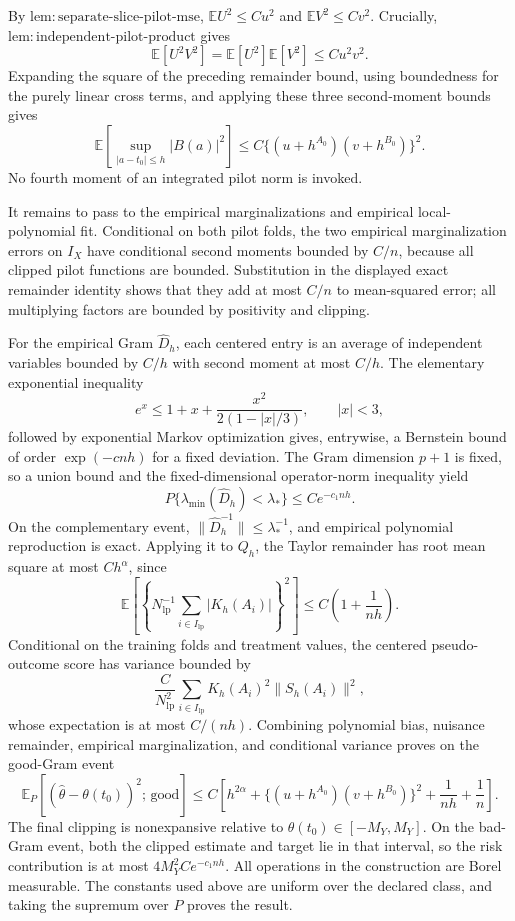 By \(\mathrm{lem:separate\text{-}slice\text{-}pilot\text{-}mse}\), \(\mathbb E U^2\le Cu^2\) and \(\mathbb E V^2\le Cv^2\). Crucially, \(\mathrm{lem:independent\text{-}pilot\text{-}product}\) gives
\[
\mathbb E[U^2V^2]=\mathbb E[U^2]\mathbb E[V^2]\le Cu^2v^2.
\]
Expanding the square of the preceding remainder bound, using boundedness for the purely linear cross terms, and applying these three second-moment bounds gives
\[
\mathbb E\left[\sup_{|a-t_0|\le h}|B(a)|^2\right]
\le C\{(u+h^{A_0})(v+h^{B_0})\}^2.
\]
No fourth moment of an integrated pilot norm is invoked.

It remains to pass to the empirical marginalizations and empirical local-polynomial fit. Conditional on both pilot folds, the two empirical marginalization errors on \(I_X\) have conditional second moments bounded by \(C/n\), because all clipped pilot functions are bounded. Substitution in the displayed exact remainder identity shows that they add at most \(C/n\) to mean-squared error; all multiplying factors are bounded by positivity and clipping.

For the empirical Gram \(\widehat D_h\), each centered entry is an average of independent variables bounded by \(C/h\) with second moment at most \(C/h\). The elementary exponential inequality
\[
e^x\le1+x+\frac{x^2}{2(1-|x|/3)},\qquad |x|<3,
\]
followed by exponential Markov optimization gives, entrywise, a Bernstein bound of order \(\exp(-cnh)\) for a fixed deviation. The Gram dimension \(p+1\) is fixed, so a union bound and the fixed-dimensional operator-norm inequality yield
\[
P\{\lambda_{\min}(\widehat D_h)<\lambda_*\}\le Ce^{-c_1nh}.
\]
On the complementary event, \(\lVert\widehat D_h^{-1}\rVert\le\lambda_*^{-1}\), and empirical polynomial reproduction is exact. Applying it to \(Q_h\), the Taylor remainder has root mean square at most \(Ch^\alpha\), since
\[
\mathbb E\left[\left\{N_{\mathrm{lp}}^{-1}\sum_{i\in I_{\mathrm{lp}}}|K_h(A_i)|\right\}^2\right]
\le C\left(1+\frac1{nh}\right).
\]
Conditional on the training folds and treatment values, the centered pseudo-outcome score has variance bounded by
\[
\frac{C}{N_{\mathrm{lp}}^2}\sum_{i\in I_{\mathrm{lp}}}K_h(A_i)^2\lVert S_h(A_i)\rVert^2,
\]
whose expectation is at most \(C/(nh)\). Combining polynomial bias, nuisance remainder, empirical marginalization, and conditional variance proves on the good-Gram event
\[
\mathbb E_P[(\widehat\theta-\theta(t_0))^2;\,\mathrm{good}]
\le C\left[h^{2\alpha}+\{(u+h^{A_0})(v+h^{B_0})\}^2+\frac1{nh}+\frac1n\right].
\]
The final clipping is nonexpansive relative to \(\theta(t_0)\in[-M_Y,M_Y]\). On the bad-Gram event, both the clipped estimate and target lie in that interval, so the risk contribution is at most \(4M_Y^2Ce^{-c_1nh}\). All operations in the construction are Borel measurable. The constants used above are uniform over the declared class, and taking the supremum over \(P\) proves the result.